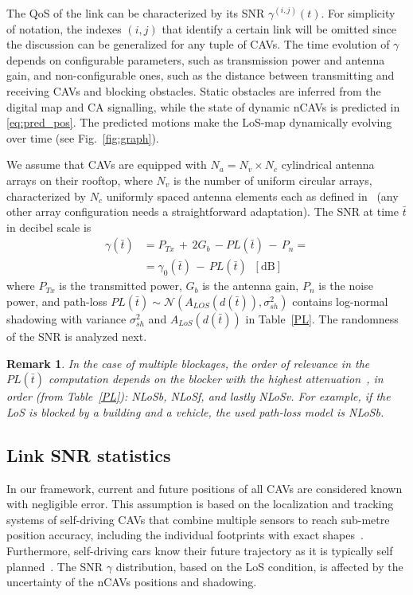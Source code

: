 \documentclass[journal]{IEEEtran}
\newtheorem{remark}{Remark}
\begin{document}
The QoS of the link can be characterized by its SNR $\gamma^{(i,j)}(t)$. 
For simplicity of notation, the indexes $(i,j)$ that identify a certain link will be omitted since the discussion can be generalized for any tuple of CAVs. 
The time evolution of $\gamma$ depends on configurable parameters, such as transmission power and antenna gain, and non-configurable ones, such as the distance between transmitting and receiving CAVs and blocking obstacles. Static obstacles are inferred from the digital map and CA signalling, while the state of dynamic nCAVs is predicted in \eqref{eq:pred_pos}. The predicted motions make the LoS-map dynamically evolving over time (see Fig.~\ref{fig:graph}). 

We assume that CAVs are equipped with $N_a = N_v \times N_c$ cylindrical antenna arrays on their rooftop, where $N_v$ is the number of uniform circular arrays, characterized by $N_c$ uniformly spaced antenna elements each as defined in~\cite{MIZMIZI2021100402} (any other array configuration needs a straightforward adaptation).
The SNR at time $\bar{t}$ in decibel scale is
%
\begin{align} \label{eq:snr}
    \gamma(\bar{t})&=P_{Tx}\,+\,2G_b\,-PL(\bar{t})\,-\,P_n = \nonumber \\
    &= \gamma_0(\bar{t})\,-\,PL(\bar{t}) \,\,\ \left[\text{dB}\right]
\end{align}
%
where $P_{Tx}$ is the transmitted power, $G_b$ is the antenna gain, $P_n$ is the noise power, and path-loss $PL(\bar{t}) \sim \mathcal{N}(A_{LOS}(d(\bar{t})),\sigma^2_{sh})$ contains log-normal shadowing %
with variance $\sigma^2_{sh}$ and $A_{LoS}(d(\bar{t}))$ in Table~\ref{PL}. The randomness of the SNR is analyzed next.

\begin{remark}
\normalfont 
In the case of multiple blockages, the order of relevance in the $PL(\bar{t})$ computation depends on the blocker with the highest attenuation~\cite{14rel,3gppNRSidelink}, in order (from Table~\ref{PL}): NLoSb, NLoSf, and lastly NLoSv. For example, if the LoS is blocked by a building and a vehicle, the used path-loss model is NLoSb.
\end{remark}

\subsection{Link SNR statistics}

In our framework, current and future positions of all CAVs are considered known with negligible error. This assumption is based on the localization and tracking systems of self-driving CAVs that combine multiple sensors to reach sub-metre position accuracy, including the individual footprints with exact shapes~\cite{rahman2018improving, TVT_path_planning}. Furthermore, self-driving cars know their future trajectory as it is typically self planned~\cite{track, soatti1, negar}. %
The SNR $\gamma$ distribution, based on the LoS condition, is affected by the uncertainty of the nCAVs positions and shadowing. 
\end{document}
